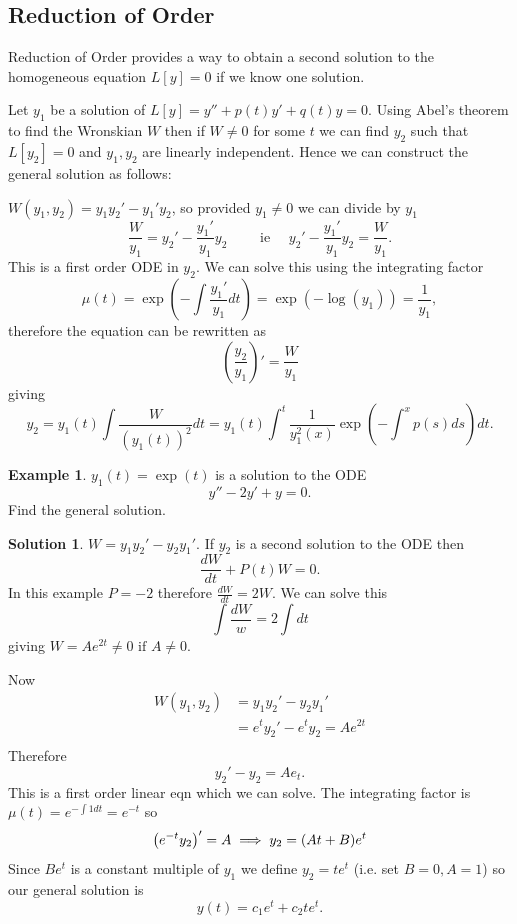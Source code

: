 \documentclass{article}
\theoremstyle{plain}
\theoremstyle{definition}
\newtheorem{exmp}{Example}[section]
\newtheorem*{sol}{Solution}
\numberwithin{equation}{section}
\begin{document}
\subsection{Reduction of Order}

Reduction of Order provides a way to obtain a second solution to the homogeneous equation $L[y]=0$ if we know one solution.

Let $y_1$ be a solution of $L[y]=y''+p(t)y'+q(t)y=0$. Using Abel's theorem to find the Wronskian $W$ then if $W\neq0$ for some $t$ we can find $y_2$ such that $L[y_2]=0$ and $y_1,y_2$ are linearly independent. Hence we can construct the general solution as follows:

$W(y_1, y_2) = y_1y_2'-y_1'y_2$, so provided $y_1\neq 0$ we can divide by $y_1$
\[
\frac{W}{y_1} = y_2' - \frac{y_1'}{y_1}y_2 \qquad \text{ ie } \quad y_2' - \frac{y_1'}{y_1}y_2 = \frac{W}{y_1}.
\]
This is a first order ODE in $y_2$. We can solve this using the integrating factor
\[
\mu(t) = \exp ( -\int \frac{y_1'}{y_1} dt ) = \exp (-\log(y_1) ) = \frac{1}{y_1},
\]
therefore the equation can be rewritten as 
\[
\left(\frac{y_2}{y_1}\right)' = \frac{W}{y_1}
\]
giving
\[
y_2 = y_1(t)\int \frac{W}{(y_1(t))^2} dt = y_1(t) \int^{t}\frac{1}{y_1^2(x)} \exp \left( -\int^x p(s) ds \right) dt.
\]

\begin{tcolorbox}
    \begin{exmp}\label{exmp:ReductionOfOrder}
        $y_1(t) = \exp(t) $ is a solution to the ODE
        \[
            y'' - 2y' + y = 0.
        \]
        Find the general solution.
    \end{exmp}
    \begin{sol}
        $W = y_1y_2' - y_2y_1'$.
        If $y_2$ is a second solution to the ODE then
        \[
        \frac{dW}{dt} + P(t)W = 0.
        \]
        In this example $P=-2$ therefore $\frac{dW}{dt} = 2W$. We can solve this
        \[
        \int \frac{dW}{w} = 2 \int dt
        \]
        giving $W=Ae^{2t} \neq 0 \text{ if } A \neq 0.$

        Now 
        \begin{align*}
            W(y_1,y_2) &= y_1y_2'-y_2y_1' \\
            &= e^ty_2' - e^ty_2 = Ae^{2t} \\
        \end{align*}    
        Therefore
        \[
            y_2' - y_2 = Ae_t.
        \]
        This is a first order linear eqn which we can solve. The integrating factor is $\mu(t) = e^{-\int 1 dt} = e^{-t}$ so
        \[
            \left(e^{-t}y_2\right)' = A \\
            \implies y_2 = (At+B)e^t
        \]
        Since $Be^t$ is a constant multiple of $y_1$ we define $y_2 = te^t$ (i.e. set $B=0, A=1$) so our general solution is
        \[
            y(t) = c_1e^t + c_2te^t.
        \]
    \end{sol}
\end{tcolorbox}
\end{document}
